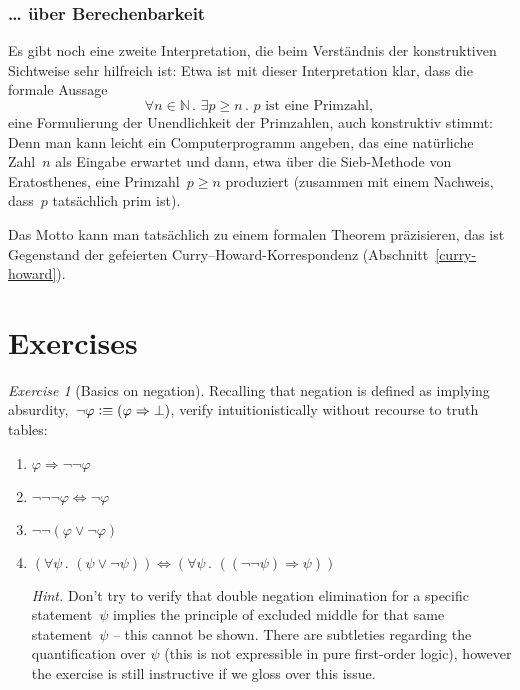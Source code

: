 \documentclass[10pt,reqno,a4paper,openany]{amsbook}
\theoremstyle{definition}
\theoremstyle{plain}
\theoremstyle{remark}
\newcommand{\NN}{\mathbb{N}}
\newcommand{\?}{\,{:}\,}
\renewcommand{\_}{\mathpunct{.}\,}
\newcommand{\defequiv}{\vcentcolon\equiv}
\newtheorem{exercise}[defn]{Exercise}
\begin{document}
\subsubsection*{\ldots{} über Berechenbarkeit}

Es gibt noch eine zweite Interpretation, die beim Verständnis der konstruktiven
Sichtweise sehr hilfreich ist:
Etwa ist mit dieser Interpretation klar, dass die formale Aussage
\[ \forall n \in \NN\_ \exists p \geq n\_ \text{$p$ ist eine Primzahl}, \]
eine Formulierung der Unendlichkeit der Primzahlen, auch konstruktiv
stimmt: Denn man kann leicht ein Computerprogramm angeben, das eine natürliche
Zahl~$n$ als Eingabe erwartet und dann, etwa über die Sieb-Methode von
Eratosthenes, eine Primzahl~$p \geq n$ produziert (zusammen mit einem Nachweis,
dass~$p$ tatsächlich prim ist).

Das Motto kann man tatsächlich zu einem formalen Theorem
präzisieren, das ist Gegenstand der gefeierten
Curry--Howard-Korrespondenz (Abschnitt~\ref{curry-howard}).



\section{Exercises}

\begin{exercise}[Basics on negation]
Recalling that negation is defined as implying absurdity,~$\neg\varphi
\defequiv (\varphi \Rightarrow \bot)$, verify intuitionistically without
recourse to truth tables:
\begin{enumerate}
\item $\varphi \Rightarrow \neg\neg\varphi$
\item $\neg\neg\neg\varphi \Leftrightarrow \neg\varphi$
\item $\neg\neg(\varphi \vee \neg\varphi)$
\item $(\forall\psi\_ (\psi \vee \neg\psi))
\Longleftrightarrow (\forall\psi\_ ((\neg\neg\psi) \Rightarrow
\psi))$

{\noindent\scriptsize\emph{Hint.}
Don't try to verify that double negation elimination for a specific
statement~$\psi$ implies the principle of excluded middle for that same
statement~$\psi$ -- this cannot be shown. There are subtleties regarding the
quantification over $\psi$ (this is not expressible in pure first-order logic),
however the exercise is still instructive if we gloss over this issue.\par}
\end{enumerate}
\end{exercise}
\end{document}
